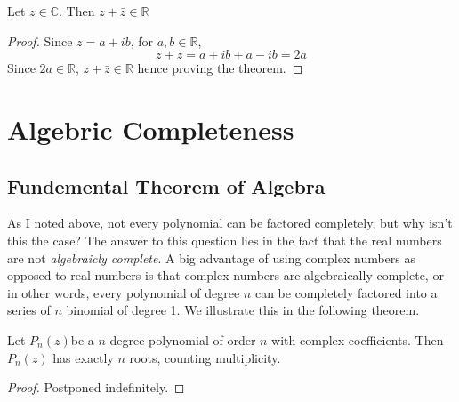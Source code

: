 \documentclass[11pt]{article}
\numberwithin{lemma}{section}
\numberwithin{equation}{section}
\numberwithin{define}{section}
\numberwithin{prop}{section}
\numberwithin{figure}{section}
\numberwithin{theorem}{section}
\numberwithin{cor}{section}
\newcounter{ex}[section]
\numberwithin{ex}{section}
\def\real{\mathbb{R}}
\def\complex{\mathbb{C}}
\begin{document}
\begin{theorem}
\label{thm:addreal}
Let $z\in\complex$. Then $z+\bar{z}\in\real$	
\end{theorem}
\begin{proof}
	Since $z=a+ib$, for $a,b\in\real$,
	$$z+\bar z=a+ib+a-ib=2a$$
	Since $2a\in\real$, $z+\bar z\in\real$ hence proving the theorem.
\end{proof}


\section{Algebric Completeness}
\subsection{Fundemental Theorem of Algebra}
As I noted above, not every polynomial can be factored completely, but why isn't this the case?
The answer to this question lies in the fact that the real numbers are not \textit{algebraicly complete}.
A big advantage of using complex numbers as opposed to real numbers is that complex numbers are algebraically complete, or in other words, every polynomial of degree $n$ can be completely factored into a series of $n$ binomial of degree 1. We illustrate this in the following theorem.

\begin{theorem}
\label{thm:fta}
	Let $P_n(z)$\footnotemark be a $n$ degree polynomial of order $n$ with complex coefficients. Then $P_n(z)$ has exactly $n$ roots, counting multiplicity.
\end{theorem}
\addtocounter{footnote}{-1}

\begin{proof}
	Postponed indefinitely.
\end{proof}
\end{document}
